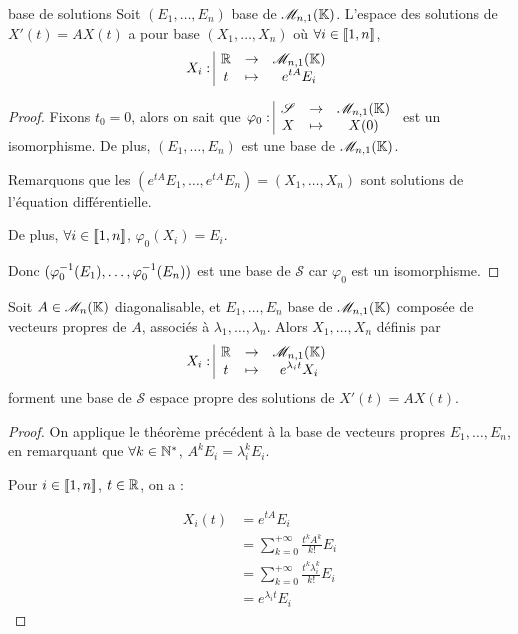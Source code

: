 \begin{theoreme}{base de solutions}{}
    Soit $(E_1, \dots, E_n)$ base de $\mathscr M_{n, 1}(\mathbb{K})$.
    L'espace des solutions de $X'(t) = A X(t)$ a pour base 
    $(X_1, \dots, X_n)$ où $\forall i \in [\![1, n]\!]$, $$X_i: \space \begin{array}{|ccc} \displaystyle \mathbb{R} & \to & \displaystyle \mathscr M_{n, 1}(\mathbb{K}) \\ \displaystyle t & \mapsto & \displaystyle e^{tA} E_i \end{array}$$
\end{theoreme}


\begin{proof}
    Fixons $t_0 = 0$, alors on sait que $\varphi_0: \space \begin{array}{|ccc} \displaystyle \mathscr S & \to & \displaystyle \mathscr M_{n, 1}(\mathbb{K}) \\ \displaystyle X & \mapsto & \displaystyle X(0) \end{array}$ 
    est un isomorphisme. De plus, $(E_1, \dots, E_n)$ est une base de $\mathscr M_{n, 1}(\mathbb{K})$. 

    Remarquons que les $(e^{tA} E_1, \dots, e^{tA}E_n) = (X_1, \dots, X_n)$ sont solutions de l'équation différentielle.

    De plus, $\forall i \in [\![1, n]\!]$, $\varphi_0(X_i) = E_i$.

    Donc $(\varphi_0^{-1}(E_1), \dots, \varphi_0^{-1}(E_n))$ est une base de $\mathscr S$ car 
    $\varphi_0$ est un isomorphisme.
\end{proof}

\begin{corollaire}{}{}
    Soit $A \in \mathscr M_n(\mathbb{K})$ diagonalisable, et $E_1, \dots, E_n$ base de $\mathscr M_{n, 1}(\mathbb{K})$
    composée de vecteurs propres de $A$,
    associés à $\lambda_1, \dots, \lambda_n$. Alors $X_1, \dots, X_n$ définis par 
    $$X_i: \space \begin{array}{|ccc} \displaystyle \mathbb{R} & \to & \displaystyle \mathscr M_{n, 1}(\mathbb{K}) \\ \displaystyle t & \mapsto & \displaystyle e^{\lambda_i t} X_i \end{array}$$ forment une base 
    de $\mathscr S$ espace propre des solutions de $X'(t) = A X(t)$.
\end{corollaire}


\begin{proof}
    On applique le théorème précédent à la base de vecteurs propres $E_1, \dots, E_n$, en 
    remarquant que $\forall k \in \mathbb{N}^*$, $A^k E_i = \lambda_i^k E_i$.

    Pour $i \in [\![1, n]\!]$, $t \in \mathbb{R}$, on a : 

    \begin{align}
        X_i(t) & = e^{tA} E_i \\
        & = \sum_{k = 0}^{+ \infty} \frac{t^k A^k}{k!} E_i \\
        & = \sum_{k = 0}^{+ \infty} \frac{t^k \lambda_i^k}{k!} E_i \\
        & = e^{\lambda_i t} E_i
    \end{align}
\end{proof}


